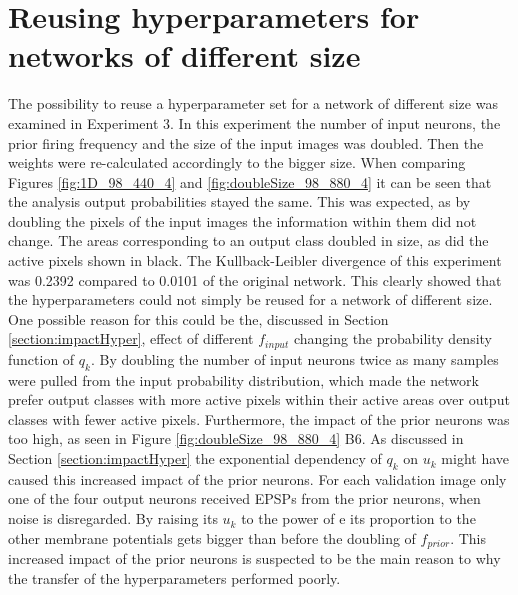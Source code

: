 \section{Reusing hyperparameters for networks of different size}
The possibility to reuse a hyperparameter set for a network of different size was examined in Experiment 3. In this experiment the number of input neurons, the prior firing frequency and the size of the input images was doubled. Then the weights were re-calculated accordingly to the bigger size. When comparing Figures \ref{fig:1D_98_440_4} and \ref{fig:doubleSize_98_880_4} it can be seen that the analysis output probabilities stayed the same. This was expected, as by doubling the pixels of the input images the information within them did not change. The areas corresponding to an output class doubled in size, as did the active pixels shown in black. The Kullback-Leibler divergence of this experiment was 0.2392 compared to 0.0101 of the original network. This clearly showed that the hyperparameters could not simply be reused for a network of different size. One possible reason for this could be the, discussed in Section \ref{section:impactHyper}, effect of different $f_{input}$ changing the probability density function of $q_k$. By doubling the number of input neurons twice as many samples were pulled from the input probability distribution, which made the network prefer output classes with more active pixels within their active areas over output classes with fewer active pixels. Furthermore, the impact of the prior neurons was too high, as seen in Figure \ref{fig:doubleSize_98_880_4} B6. As discussed in Section \ref{section:impactHyper} the exponential dependency of $q_k$ on $u_k$ might have caused this increased impact of the prior neurons. For each validation image only one of the four output neurons received EPSPs from the prior neurons, when noise is disregarded. By raising its $u_k$ to the power of e its proportion to the other membrane potentials gets bigger than before the doubling of $f_{prior}$. This increased impact of the prior neurons is suspected to be the main reason to why the transfer of the hyperparameters performed poorly.

